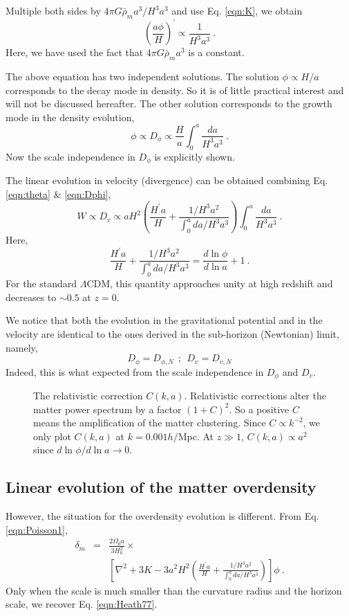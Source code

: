 \documentclass[aps,prl,showpacs,nobibnotes,twocolumn,
nobalancelastpage,superscriptaddress]{revtex4}
\newcommand{\be}{\begin{equation}}
\newcommand{\ee}{\end{equation}}
\newcommand{\ba}{\begin{eqnarray}}
\newcommand{\ea}{\end{eqnarray}}
\newcommand{\bfi}{\begin{figure}
\epsfxsize=9cm
\epsffile}
\newcommand{\efi}{\end{figure}}
\begin{document}
Multiple both sides by $4\pi G\bar{\rho}_ma^3/H^3a^3$ and use Eq. \ref{eqn:K},
we obtain 
\be
\left(\frac{a\phi}{H}\right)^{'}\propto \frac{1}{H^3a^3}\ .
\ee
Here, we have used the fact that $4\pi G\bar{\rho}_ma^3$ is a constant. 

The above equation has two independent solutions. The
solution $\phi\propto H/a$ corresponds to the decay mode in density. So it is
of little practical interest and will not be discussed hereafter. The other
solution corresponds to the growth mode in the density evolution, 
\be
\label{eqn:Dphi}
\phi\propto D_{\phi}\propto \frac{H}{a}\int_0^a \frac{da}{H^3a^3}\ .
\ee
Now the scale independence in $D_\phi$ is explicitly shown. 

The linear evolution in velocity (divergence) can be obtained combining
Eq. \ref{eqn:theta}  \& \ref{eqn:Dphi}, 
\be
W\propto D_v\propto aH^2\left(\frac{H^{'}a}{H}+\frac{1/H^3a^2}{\int_0^a
    da/H^3a^3}\right)\int_0^a \frac{da}{H^3a^3}\ .
\ee
Here, 
\be
\frac{H^{'}a}{H}+\frac{1/H^3a^2}{\int_0^a
    da/H^3a^3}=\frac{d\ln \phi}{d\ln a}+1 \ .
\ee
For the standard $\Lambda$CDM,  this quantity approaches unity at high redshift
and decreases to $\sim 0.5$ at $z=0$. 



We notice that both the evolution in the gravitational potential and in the
velocity are identical to the ones derived in the sub-horizon (Newtonian) limit, namely,
\be
\label{eqn:phiv}
D_{\phi}=D_{\phi,N}\ \ ;\ \ D_v=D_{v,N}
\ee
Indeed, this is what expected from the scale independence in $D_\phi$ and
$D_v$. 

\bfi{fig1.eps}
\caption{The relativistic correction $C(k,a)$. Relativistic corrections alter
  the matter power spectrum by a factor $(1+C)^2$. So a positive $C$ means the
  amplification of the matter clustering. Since $C\propto k^{-2}$, we
  only plot $C(k,a)$ at $k=0.001 h/$Mpc. At $z\gg 1$, $C(k,a)\propto a^2$
  since $d\ln \phi/d\ln a\rightarrow 0$. \label{fig:C}}
\efi


\subsection{Linear evolution of the matter overdensity}
However, the situation for the overdensity evolution is different. From
Eq. \ref{eqn:Poisson1},  
\ba
\delta_m&=&\frac{2\Omega_0a}{3H_0^2}\times \\
&& \left[\nabla^2+3K-3a^2H^2\left(\frac{H^{'}a}{H}+\frac{1/H^3a^2}{\int_0^a
    da/H^3a^3}\right)\right]\phi\ . \nonumber
\ea
Only when the scale is much smaller than the curvature radius  and the horizon
scale, we recover Eq. \ref{eqn:Heath77}.
\end{document}
